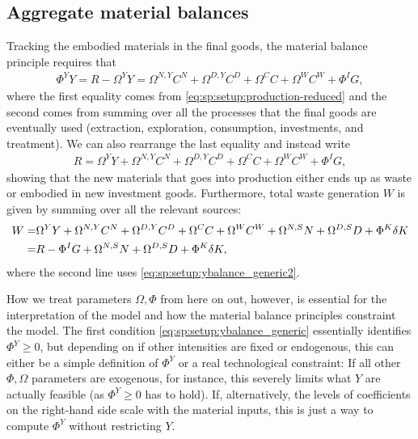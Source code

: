 \subsection{Aggregate material balances}
\label{sec:sp:setup:aggregatematerial}
Tracking the embodied materials in the final goods, the material balance principle requires that
\begin{align}
    \Phi^Y Y = R - \Omega^Y Y = \Omega^{N,Y}C^N + \Omega^{D,Y}C^D + \Omega^C C + \Omega^W C^W +\Phi^I G, \label{eq:sp:setup:ybalance_generic}
\end{align}
where the first equality comes from \eqref{eq:sp:setup:production-reduced} and the second comes from summing over all the processes that the final goods are eventually used (extraction, exploration, consumption, investments, and treatment). We can also rearrange the last equality and instead write
\begin{align}
    R =  \Omega^Y Y + \Omega^{N,Y}C^N + \Omega^{D,Y}C^D + \Omega^C C + \Omega^W C^W + \Phi^I G \label{eq:sp:setup:ybalance_generic2},
\end{align}
showing that the new materials that goes into production either ends up as waste or embodied in new investment goods. Furthermore, total waste generation $W$ is given by summing over all the relevant sources:
\begin{align}
    W =& \Omega^Y Y + \Omega^{N,Y}C^N + \Omega^{D,Y}C^D + \Omega^C C + \Omega^W C^W + \Omega^{N,S}N + \Omega^{D,S}D + \Phi^K \delta K \notag \\
    =& R - \Phi^I G + \Omega^{N,S}N + \Omega^{D,S}D + \Phi^K\delta K,
    \label{eq:sp:setup:totalwaste_generic}
\end{align}
where the second line uses \eqref{eq:sp:setup:ybalance_generic2}. 



\bigskip
How we treat parameters $\Omega, \Phi$ from here on out, however, is essential for the interpretation of the model and how the material balance principles constraint the model. The first condition \eqref{eq:sp:setup:ybalance_generic} essentially identifies $\Phi^Y\geq0$, but depending on if other intensities are fixed or endogenous, this can either be a simple definition of $\Phi^Y$ or a real technological constraint: If all other $\Phi, \Omega$ parameters are exogenous, for instance, this severely limits what $Y$ are actually feasible (as $\Phi^Y \geq 0$ has to hold). If, alternatively, the levels of coefficients on the right-hand side scale with the material inputs, this is just a way to compute $\Phi^Y$ without restricting $Y$. 




